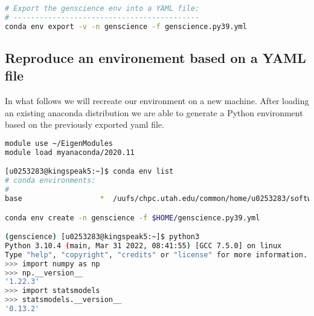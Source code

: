 \documentclass[10pt]{article}
\begin{document}
\begin{lstlisting}[language=bash]
# Export the genscience env into a YAML file:
# -------------------------------------------
conda env export -v -n genscience -f genscience.py39.yml
\end{lstlisting}

\subsection{Reproduce an environement based on a YAML file}
In what follows we will recreate our environment on a new machine.
After loading an existing anaconda distribution we are able to generate a
Python environment based on the previously exported yaml file.

\begin{lstlisting}[language=bash]
module use ~/EigenModules
module load myanaconda/2020.11

[u0253283@kingspeak5:~]$ conda env list
# conda environments:
#
base                  *  /uufs/chpc.utah.edu/common/home/u0253283/software/pkg/anaconda3/2020.11

conda env create -n genscience -f $HOME/genscience.py39.yml

(genscience) [u0253283@kingspeak5:~]$ python3
Python 3.10.4 (main, Mar 31 2022, 08:41:55) [GCC 7.5.0] on linux
Type "help", "copyright", "credits" or "license" for more information.
>>> import numpy as np
>>> np.__version__
'1.22.3'
>>> import statsmodels
>>> statsmodels.__version__
'0.13.2'

\end{lstlisting}




\end{document}
